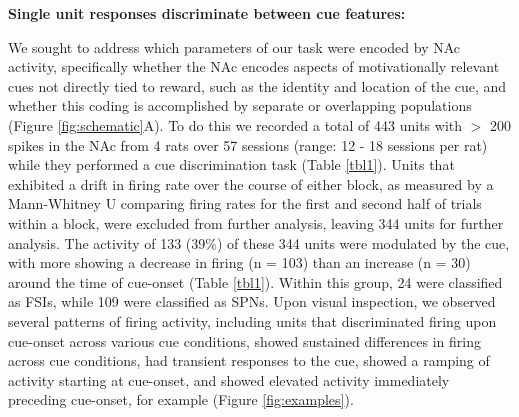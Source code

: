 \documentclass[11pt]{article}
\begin{document}
{\bf Single unit responses discriminate between cue features:}

We sought to address which parameters of our task were encoded by NAc activity, specifically whether the NAc encodes aspects of motivationally relevant cues not directly tied to reward, such as the identity and location of the cue, and whether this coding is accomplished by separate or overlapping populations (Figure \ref{fig:schematic}A). To do this we recorded a total of 443 units with $>$ 200 spikes in the NAc from 4 rats over 57 sessions (range: 12 - 18 sessions per rat) while they performed a cue discrimination task (Table \ref{tbl1}). Units that exhibited a drift in firing rate over the course of either block, as measured by a Mann-Whitney U comparing firing rates for the first and second half of trials within a block, were excluded from further analysis, leaving 344 units for further analysis. The activity of 133 (39\%) of these 344 units were modulated by the cue, with more showing a decrease in firing (n = 103) than an increase (n = 30) around the time of cue-onset (Table \ref{tbl1}). Within this group, 24 were classified as FSIs, while 109 were classified as SPNs. Upon visual inspection, we observed several patterns of firing activity, including units that discriminated firing upon cue-onset across various cue conditions, showed sustained differences in firing across cue conditions, had transient responses to the cue, showed a ramping of activity starting at cue-onset, and showed elevated activity immediately preceding cue-onset, for example (Figure \ref{fig:examples}). 
\end{document}
